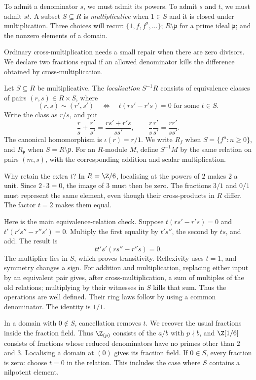 To admit a denominator $s$, we must admit its powers. To admit $s$ and $t$, we must admit $st$. A subset $S\subseteq R$ is \emph{multiplicative} when $1\in S$ and it is closed under multiplication. Three choices will recur: $\{1,f,f^2,\ldots\}$; $R\setminus\mathfrak p$ for a prime ideal $\mathfrak p$; and the nonzero elements of a domain.

Ordinary cross-multiplication needs a small repair when there are zero divisors. We declare two fractions equal if an allowed denominator kills the difference obtained by cross-multiplication.

\begin{definition}\label{def:localisation}
Let $S\subseteq R$ be multiplicative. The \emph{localisation} $S^{-1}R$ consists of equivalence classes of pairs $(r,s)\in R\times S$, where
\[
(r,s)\sim(r',s')\quad\Longleftrightarrow\quad
 t(rs'-r's)=0\text{ for some }t\in S.
\]
Write the class as $r/s$, and put
\[
\frac rs+\frac{r'}{s'}=\frac{rs'+r's}{ss'},\qquad
\frac rs\frac{r'}{s'}=\frac{rr'}{ss'}.
\]
The canonical homomorphism is $\iota(r)=r/1$. We write $R_f$ when $S=\{f^n:n\ge0\}$, and $R_{\mathfrak p}$ when $S=R\setminus\mathfrak p$. For an $R$-module $M$, define $S^{-1}M$ by the same relation on pairs $(m,s)$, with the corresponding addition and scalar multiplication.
\end{definition}

Why retain the extra $t$? In $R=\Z/6$, localising at the powers of $2$ makes $2$ a unit. Since $2\cdot3=0$, the image of $3$ must then be zero. The fractions $3/1$ and $0/1$ must represent the same element, even though their cross-products in $R$ differ. The factor $t=2$ makes them equal.

Here is the main equivalence-relation check. Suppose
$t(rs'-r's)=0$ and $t'(r's''-r''s')=0$. Multiply the first equality by $t's''$, the second by $ts$, and add. The result is
\[
 tt's'(rs''-r''s)=0.
\]
The multiplier lies in $S$, which proves transitivity. Reflexivity uses $t=1$, and symmetry changes a sign. For addition and multiplication, replacing either input by an equivalent pair gives, after cross-multiplication, a sum of multiples of the old relations; multiplying by their witnesses in $S$ kills that sum. Thus the operations are well defined. Their ring laws follow by using a common denominator. The identity is $1/1$.

In a domain with $0\notin S$, cancellation removes $t$. We recover the usual fractions inside the fraction field. Thus $\Z_{(p)}$ consists of the $a/b$ with $p\nmid b$, and $\Z[1/6]$ consists of fractions whose reduced denominators have no primes other than $2$ and $3$. Localising a domain at $(0)$ gives its fraction field. If $0\in S$, every fraction is zero: choose $t=0$ in the relation. This includes the case where $S$ contains a nilpotent element.

